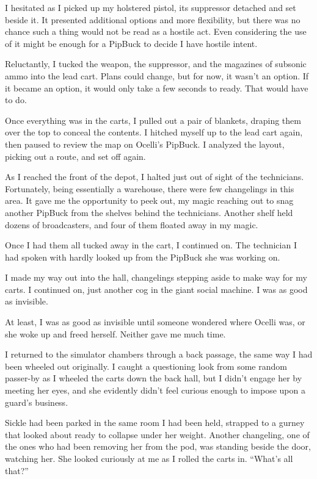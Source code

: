 I hesitated as I picked up my holstered pistol, its suppressor detached and set beside it. It presented additional options and more flexibility, but there was no chance such a thing would not be read as a hostile act. Even considering the use of it might be enough for a PipBuck to decide I have hostile intent.

Reluctantly, I tucked the weapon, the suppressor, and the magazines of subsonic ammo into the lead cart. Plans could change, but for now, it wasn’t an option. If it became an option, it would only take a few seconds to ready. That would have to do.

Once everything was in the carts, I pulled out a pair of blankets, draping them over the top to conceal the contents. I hitched myself up to the lead cart again, then paused to review the map on Ocelli’s PipBuck. I analyzed the layout, picking out a route, and set off again.

As I reached the front of the depot, I halted just out of sight of the technicians. Fortunately, being essentially a warehouse, there were few changelings in this area. It gave me the opportunity to peek out, my magic reaching out to snag another PipBuck from the shelves behind the technicians. Another shelf held dozens of broadcasters, and four of them floated away in my magic.

Once I had them all tucked away in the cart, I continued on. The technician I had spoken with hardly looked up from the PipBuck she was working on.

I made my way out into the hall, changelings stepping aside to make way for my carts. I continued on, just another cog in the giant social machine. I was as good as invisible.

At least, I was as good as invisible until someone wondered where Ocelli was, or she woke up and freed herself. Neither gave me much time.

I returned to the simulator chambers through a back passage, the same way I had been wheeled out originally. I caught a questioning look from some random passer-by as I wheeled the carts down the back hall, but I didn’t engage her by meeting her eyes, and she evidently didn’t feel curious enough to impose upon a guard’s business.

Sickle had been parked in the same room I had been held, strapped to a gurney that looked about ready to collapse under her weight. Another changeling, one of the ones who had been removing her from the pod, was standing beside the door, watching her. She looked curiously at me as I rolled the carts in. “What’s all that?”

